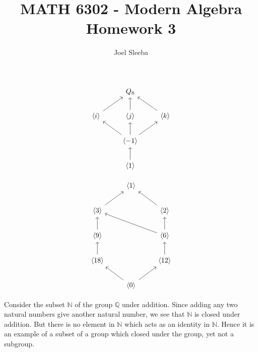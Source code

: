 \documentclass[12pt]{exam}
\theoremstyle{plain} %
\theoremstyle{definition} %
\theoremstyle{remark} %
\begin{document}
\title{MATH 6302 - Modern Algebra \\ Homework 3}

\author{
Joel Sleeba \\
}

\maketitle
\printanswers
\unframedsolutions

\begin{questions}
  
  \question
  \begin{solution}
    \[\begin{tikzcd}
    	& {Q_8} \\
    	{\langle i \rangle} & {\langle j \rangle} & {\langle k \rangle} \\
    	& {\langle -1\rangle} \\
    	& {\langle 1 \rangle}
    	\arrow[from=2-1, to=1-2]
    	\arrow[from=2-2, to=1-2]
    	\arrow[from=2-3, to=1-2]
    	\arrow[from=3-2, to=2-1]
    	\arrow[from=3-2, to=2-2]
    	\arrow[from=3-2, to=2-3]
    	\arrow[from=4-2, to=3-2]
    \end{tikzcd}\]
  \end{solution}

  \question
  \begin{solution}
    \[\begin{tikzcd}
    	& {\langle 1\rangle} \\
    	{\langle 3\rangle} && {\langle 2\rangle} \\
    	{\langle 9\rangle} && {\langle 6\rangle} \\
    	{\langle 18\rangle} && {\langle 12\rangle} \\
    	& {\langle 0\rangle}
    	\arrow[from=2-1, to=1-2]
    	\arrow[from=2-3, to=1-2]
    	\arrow[from=3-1, to=2-1]
    	\arrow[from=3-3, to=2-1]
    	\arrow[from=3-3, to=2-3]
    	\arrow[from=4-1, to=3-1]
    	\arrow[from=4-3, to=3-3]
    	\arrow[from=5-2, to=4-1]
    	\arrow[from=5-2, to=4-3]
    \end{tikzcd}\]
  \end{solution}

  \question
  \begin{solution}
    Consider the subset $\mathbb{N}$ of the group $\mathbb{Q}$ under addition. Since adding any two natural numbers give another natural number, we see that $\mathbb{N}$ is closed under addition. But there is no element in $\mathbb{N}$ which acts as an identity in $\mathbb{N}$. Hence it is an example of a subset of a group which closed under the group, yet not a subgroup.
  \end{solution}


\end{questions}
\end{document}
